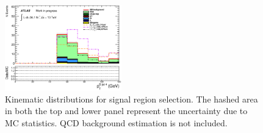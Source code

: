 \begin{figure}[h!]
\begin{center}
    \includegraphics[width=0.45\textwidth]{figures/plotSR/SR_ND1_pTjV4_7SR.eps}
    \caption[Kinematic distributions for signal region selection]{ Kinematic distributions for signal region selection. The hashed area in both the top and lower panel represent the uncertainty due to MC statistics.  QCD background estimation is not included.  }
  \label{fig:SR}
    \end{center}
\end{figure}



